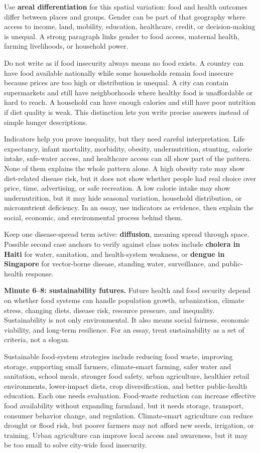 \documentclass[11pt,a4paper]{article}
\newcommand{\term}[1]{\textcolor{HeadingBlue}{\textbf{#1}}}
\begin{document}
Use \term{areal differentiation} for this spatial variation: food and health
outcomes differ between places and groups. Gender can be part of that geography
where access to income, land, mobility, education, healthcare, credit, or
decision-making is unequal. A strong paragraph links gender to food access,
maternal health, farming livelihoods, or household power.

Do not write as if food insecurity always means no food exists. A country can
have food available nationally while some households remain food insecure
because prices are too high or distribution is unequal. A city can contain
supermarkets and still have neighborhoods where healthy food is unaffordable or
hard to reach. A household can have enough calories and still have poor
nutrition if diet quality is weak. This distinction lets you write precise
answers instead of simple hunger descriptions.

Indicators help you prove inequality, but they need careful interpretation.
Life expectancy, infant mortality, morbidity, obesity, undernutrition,
stunting, calorie intake, safe-water access, and healthcare access can all show
part of the pattern. None of them explains the whole pattern alone. A high
obesity rate may show diet-related disease risk, but it does not show whether
people had real choice over price, time, advertising, or safe recreation. A low
calorie intake may show undernutrition, but it may hide seasonal variation,
household distribution, or micronutrient deficiency. In an essay, use
indicators as evidence, then explain the social, economic, and environmental
process behind them.

Keep one disease-spread term active: \term{diffusion}, meaning spread through
space. Possible second case anchors to verify against class notes include
\term{cholera in Haiti} for water, sanitation, and health-system weakness, or
\term{dengue in Singapore} for vector-borne disease, standing water,
surveillance, and public-health response.

\textbf{Minute 6--8: sustainability futures.}
Future health and food security depend on whether food systems can handle
population growth, urbanization, climate stress, changing diets, disease risk,
resource pressure, and inequality. Sustainability is not only environmental.
It also means social fairness, economic viability, and long-term resilience.
For an essay, treat sustainability as a set of criteria, not a slogan.

Sustainable food-system strategies include reducing food waste, improving
storage, supporting small farmers, climate-smart farming, safer water and
sanitation, school meals, stronger food safety, urban agriculture, healthier
retail environments, lower-impact diets, crop diversification, and better
public-health education. Each one needs evaluation. Food-waste reduction can
increase effective food availability without expanding farmland, but it needs
storage, transport, consumer behavior change, and regulation. Climate-smart
agriculture can reduce drought or flood risk, but poorer farmers may not afford
new seeds, irrigation, or training. Urban agriculture can improve local access
and awareness, but it may be too small to solve city-wide food insecurity.
\end{document}
